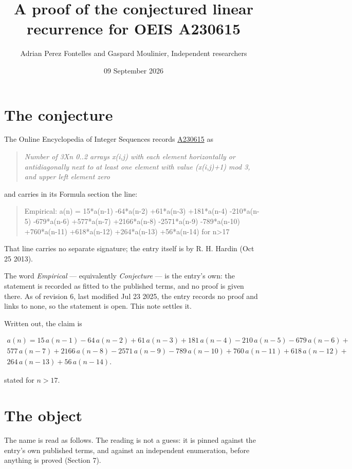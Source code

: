 \documentclass[11pt]{article}
\title{A proof of the conjectured linear recurrence for OEIS A230615}
\author{Adrian Perez Fontelles and Gaspard Moulinier, Independent researchers}
\date{09 September 2026}
\theoremstyle{definition}
\begin{document}
\maketitle
\section{The conjecture}

The Online Encyclopedia of Integer Sequences records \href{https://oeis.org/A230615}{A230615} as

\begin{quote}\itshape Number of 3Xn 0..2 arrays x(i,j) with each element horizontally or antidiagonally next to at least one element with value (x(i,j)+1) mod 3, and upper left element zero\end{quote}

and carries in its Formula section the line:

\begin{quote}\ttfamily Empirical: a(n) = 15*a(n-1) -64*a(n-2) +61*a(n-3) +181*a(n-4) -210*a(n-5) -679*a(n-6) +577*a(n-7) +2166*a(n-8) -2571*a(n-9) -789*a(n-10) +760*a(n-11) +618*a(n-12) +264*a(n-13) +56*a(n-14) for n>17\end{quote}

That line carries no separate signature; the entry itself is by R. H. Hardin (Oct 25 2013).

The word {\itshape Empirical} --- equivalently {\itshape Conjecture} --- is the entry's own: the statement is recorded as fitted to the published terms, and no proof is given there. As of revision 6, last modified Jul 23 2025, the entry records no proof and links to none, so the statement is open. This note settles it.

Written out, the claim is

\begin{multline*} a(n) = 15\,a(n-1) - 64\,a(n-2) + 61\,a(n-3) + 181\,a(n-4) - 210\,a(n-5) - 679\,a(n-6) + \\ 577\,a(n-7) + 2166\,a(n-8) - 2571\,a(n-9) - 789\,a(n-10) + 760\,a(n-11) + 618\,a(n-12) + \\ 264\,a(n-13) + 56\,a(n-14). \end{multline*}

stated for $n > 17$.

\section{The object}

The name is read as follows. The reading is not a guess: it is pinned against the entry's own published terms, and against an independent enumeration, before anything is proved (Section 7).
\end{document}
